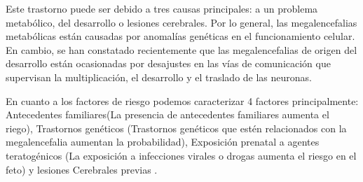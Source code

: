 Este trastorno puede ser debido a tres causas principales: a un problema metabólico, del desarrollo o lesiones cerebrales. Por lo general, las megalencefalias metabólicas están causadas por anomalías genéticas en el funcionamiento celular. En cambio, se han constatado recientemente \cite{winden_megalencephaly_2015} que las megalencefalias de origen del desarrollo están ocasionadas por desajustes en las vías de comunicación que supervisan la multiplicación, el desarrollo y el traslado de las neuronas.

En cuanto a los factores de riesgo podemos caracterizar 4 factores principalmente: Antecedentes familiares(La presencia de antecedentes familiares aumenta el riego), Trastornos genéticos (Trastornos genéticos que estén relacionados con la megalencefalia aumentan la probabilidad), Exposición prenatal a agentes teratogénicos (La exposición a infecciones virales o drogas aumenta el riesgo en el feto) y lesiones Cerebrales previas \cite{winden_megalencephaly_2015}. \\
